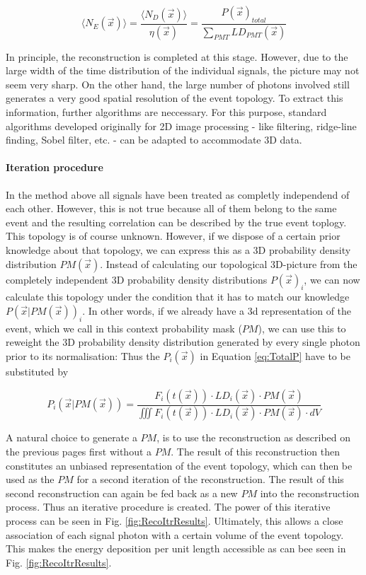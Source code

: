   \begin{equation}
     \langle N_{E}(\vec{x}) \rangle = \frac{\langle N_{D}(\vec{x}) \rangle}{\eta(\vec{x})} = \frac{P(\vec{x})_{total}}{\sum_{PMT} LD_{PMT}(\vec{x})}
  \end{equation}
  
  
  In principle, the reconstruction is completed at this stage. However, due to the large width of the time distribution of the individual signals, the picture may not seem very
  sharp. On the other hand, the large number of photons involved still generates a very good spatial resolution of the event topology.
  To extract this information, further algorithms are neccessary. For this purpose, standard algorithms developed originally for 2D image processing - like filtering, ridge-line finding,
  Sobel filter, etc. - can be adapted to accommodate 3D data.
  
  
  \paragraph{Iteration procedure}
  
   In the method above all signals have been treated as completly independend of each other. However, this is not true because all of them belong to the same event
  and the resulting correlation can be described by the true event toplogy. This topology is of course unknown. However, if we dispose of a certain prior knowledge about that topology,
  we can express this as a 3D probability density distribution $PM(\vec{x})$. Instead of calculating our topological 3D-picture from the completely independent 3D probability density 
  distributions $P(\vec{x})_{i}$, we can now calculate this topology under the condition that it has to match 
  our knowledge $P(\vec{x}|PM(\vec{x}))_{i}$. In other words, if we already have a 3d representation of the event, which we call in this context probability mask ($PM$), we can use
  this to reweight the 3D probability density distribution generated by every single photon prior to its normalisation: Thus the $P_i(\vec{x})$ in Equation \ref{eq:TotalP} have to be substituted by
  
  \begin{equation}
     P_{i}(\vec{x}|PM(\vec{x})) = \frac{F_{i}(t(\vec{x})) \cdot LD_{i}(\vec{x}) \cdot PM(\vec{x})}{\iiint F_{i}(t(\vec{x})) \cdot LD_{i}(\vec{x}) \cdot PM(\vec{x}) \cdot dV}
  \end{equation}
  
    
  A natural choice to generate a $PM$, is to use the reconstruction as described on the previous pages first without a $PM$. The result
  of this reconstruction then constitutes an unbiased representation of the event topology, which can then be used as the $PM$ for a second
  iteration of the reconstruction. The result of this second reconstruction can again be fed back as a new $PM$ into the reconstruction 
  process. Thus an iterative procedure is created. The power of this iterative process can be seen in Fig. \ref{fig:RecoItrResults}. Ultimately, this allows
  a close association of each signal photon with a certain volume of the event topology. This makes the energy deposition per unit length 
  accessible as can bee seen in Fig. \ref{fig:RecoItrResults}. 
  
